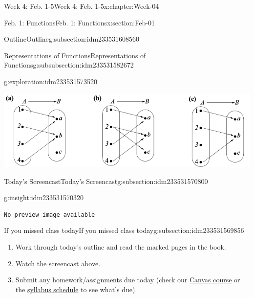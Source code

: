 \documentclass[oneside,10pt,]{book}
\newcommand{\mono}[1]{\texttt{#1}}
\numberwithin{equation}{section}
\newlength{\qrsize}
\newlength{\previewwidth}
\begin{document}
\begin{chapterptx}{Week 4: Feb. 1-5}{}{Week 4: Feb. 1-5}{}{}{x:chapter:Week-04}
\begin{sectionptx}{Feb. 1: Functions}{}{Feb. 1: Functions}{}{}{x:section:Feb-01}
\begin{subsectionptx}{Outline}{}{Outline}{}{}{g:subsection:idm233531608560}
\begin{subsubsectionptx}{Representations of Functions}{}{Representations of Functions}{}{}{g:subsubsection:idm233531582672}
\begin{exploration}{}{g:exploration:idm233531573520}
\begin{image}{0.1}{0.8}{0.1}%
\includegraphics[width=\linewidth]{./img/arrow-diagrams.png}
\end{image}%
\end{exploration}%
\end{subsubsectionptx}
\end{subsectionptx}
%
%
\typeout{************************************************}
\typeout{************************************************}
%
\begin{subsectionptx}{Today's Screencast}{}{Today's Screencast}{}{}{g:subsection:idm233531570800}
\begin{insight}{}{g:insight:idm233531570320}%
\setlength{\qrsize}{9em}
\setlength{\previewwidth}{\linewidth}
\addtolength{\previewwidth}{-\qrsize}
\begin{tcbraster}[raster columns=2, raster column skip=1pt, raster halign=center, raster force size=false, raster left skip=0pt, raster right skip=0pt]%
\begin{tcolorbox}[previewstyle, width=\previewwidth]%
\mono{No preview image available}%
\end{tcolorbox}%
\begin{tcolorbox}[qrstyle]%
[QR LINK]\end{tcolorbox}%
\end{tcbraster}%
\end{insight}
\end{subsectionptx}
%
%
\typeout{************************************************}
\typeout{************************************************}
%
\begin{subsectionptx}{If you missed class today}{}{If you missed class today}{}{}{g:subsection:idm233531569856}
%
\begin{enumerate}
\item{}Work through today's outline and read the marked pages in the book.%
\item{}Watch the screencast above.%
\item{}Submit any homework\slash{}assignments due today (check our \href{https://dordt.instructure.com/courses/3110050}{Canvas course} or the \href{https://prof.mkjanssen.org/ds/index.html\#schedule}{syllabus schedule} to see what's due).%

\end{enumerate}
\end{subsectionptx}
\end{sectionptx}
\end{chapterptx}
\end{document}
